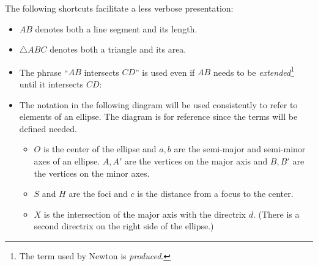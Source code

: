 \pagebreak[2]

The following shortcuts facilitate a less verbose presentation:
\begin{itemize}

\item $AB$ denotes both a line segment and its length.
\item $\triangle ABC$ denotes both a triangle and its area.
\item The phrase ``$AB$ intersects $CD$'' is used even if $AB$ needs to be \emph{extended}\footnote{The term used by Newton is \emph{produced}.} until it intersects $CD$:
\begin{center}
\vspace{-2ex}
\vspace{-2ex}
\end{center}
\item The notation in the following diagram will be used consistently to refer to elements of an ellipse. The diagram is for reference since the terms will be defined needed.
\begin{itemize}
\item $O$ is the center of the ellipse and $a,b$ are the semi-major and semi-minor axes of an ellipse. $A,A'$ are the vertices on the major axis and $B,B'$ are the vertices on the minor axes.
\item $S$ and $H$ are the foci and $c$ is the distance from a focus to the center.
\item $X$ is the intersection of the major axis with the directrix $d$. (There is a second directrix on the right side of the ellipse.)
\end{itemize}
\end{itemize}


